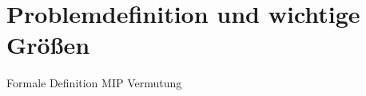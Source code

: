\section{Problemdefinition und wichtige Größen}

\begin{frame}
	Formale Definition MIP
	Vermutung
\end{frame}

